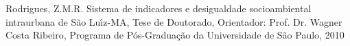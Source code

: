 \documentclass[
12pt,		%
openright,	%
twoside,  %
a4paper,			%
chapter=TITLE,		%
english,			%
french,				%
spanish,			%
brazil				%
]{USPSC-classe/USPSC_RedarTex}
\begin{document}
\begin{flushleft}
\begin{flushleft}
\begin{flushleft}
\begin{flushleft}
\begin{flushleft}
\begin{flushleft}
\begin{flushleft}
\begin{flushleft}
\begin{flushleft}
\begin{flushleft}
[Rodrigues, 2010] Rodrigues, Z.M.R. Sistema de indicadores e desigualdade socioambiental intraurbana de S\~ao Lu\'{\i}z-MA, Tese de Doutorado, Orientador: Prof. Dr. Wagner Costa Ribeiro, Programa de P\'os-Gradua\c{c}\~ao da Universidade de S\~ao Paulo, 2010
\end{flushleft}


\end{flushleft}


\end{flushleft}


\end{flushleft}


\end{flushleft}


\end{flushleft}


\end{flushleft}


\end{flushleft}


\end{flushleft}


\end{flushleft}
\end{document}
